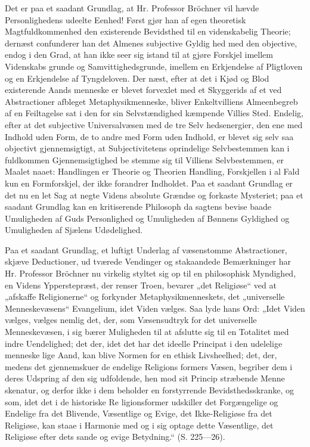\documentclass[12pt]{book}
\newcommand{\opage}[1]{\marginnote{\footnotesize\textit{[#1]}}}
\begin{document}
Det er paa et saadant Grundlag, at Hr. Professor
Bröchner vil hævde Personlighedens udeelte Eenhed!
Først gjør han af egen theoretisk Magtfuldkommenhed
den existerende Bevidsthed til en videnskabelig Theorie;
dernæst confunderer han det Almenes subjective Gyldig\-%
hed med den objective, endog i den Grad, at han ikke
seer sig istand til at gjøre Forskjel imellem Videnskabs\-%
grunde og Samvittighedsgrunde, imellem en Erkjendelse
af Pligtloven og en Erkjendelse af Tyngdeloven. Der\-%
næst, efter at det i Kjød og Blod existerende Aands\-%
menneske er blevet forvexlet med et Skyggerids af et
ved Abstractioner afbleget Metaphysikmenneske, bliver
Enkeltvilliens Almeenbegreb af en Feiltagelse sat i den
for sin Selvstændighed kæmpende Villies Sted. Endelig,
efter at det subjective Universalvæsen med de tre Selv\-%
hedsenergier, den ene med Indhold uden Form, de to
\opage{44}\setcounter{footnote}{0}%
andre med Form uden Indhold, er blevet sig selv saa
objectivt gjennemsigtigt, at Subjectivitetens oprindelige
Selvbestemmen kan i fuldkommen Gjennemsigtighed be\-%
stemme sig til Villiens Selvbestemmen, er Maalet naaet:
Handlingen er Theorie og Theorien Handling, Forskjellen
i al Fald kun en Formforskjel, der ikke forandrer Indholdet.
Paa et saadant Grundlag er det nu en let Sag at negte
Videns absolute Grændse og forkaste Mysteriet; paa et
saadant Grundlag kan en kritiserende Philosoph da
sagtens bevise baade Umuligheden af Guds Personlighed
og Umuligheden af Bønnens Gyldighed og Umuligheden
af Sjælens Udødelighed.

Paa et saadant Grundlag, et luftigt Underlag af
væsenstomme Abstractioner, skjæve Deductioner, ud\-%
tværede Vendinger og stakaandede Bemærkninger har
Hr. Professor Bröchner nu virkelig styltet sig op til en
philosophisk Myndighed, en Videns Ypperstepræst, der
renser Troen, bevarer „det Religiøse“ ved at „afskaffe
Religionerne“ og forkynder Metaphysikmenneskets, det
„universelle Menneskevæsens“ Evangelium, idet Viden
vælges. Saa lyde hans Ord: „Idet Viden vælges, vælges
nemlig det, der, som Væsensudtryk for det universelle
Menneskevæsen, i sig bærer Muligheden til at afslutte
sig til en Totalitet med indre Uendelighed; det der, idet
det har det ideelle Principat i den udelelige menneske\-%
lige Aand, kan blive Normen for en ethisk Livsheelhed;
det, der, medens det gjennemskuer de endelige Religions\-%
formers Væsen, begriber dem i deres Udspring af den
sig udfoldende, hen mod sit Princip stræbende Menne\-%
skenatur, og derfor ikke i dem beholder en forstyrrende
Bevidsthedsskranke, og som, idet det i de historiske Re\-%
ligionsformer udskiller det Forgængelige og Endelige fra
det Blivende, Væsentlige og Evige, det Ikke-Religiøse
fra det Religiøse, kan staae i Harmonie med og i sig
\opage{45}\setcounter{footnote}{0}%
optage dette Væsentlige, det Religiøse efter dets sande og
evige Betydning.“ (S. 225---26).
\end{document}
